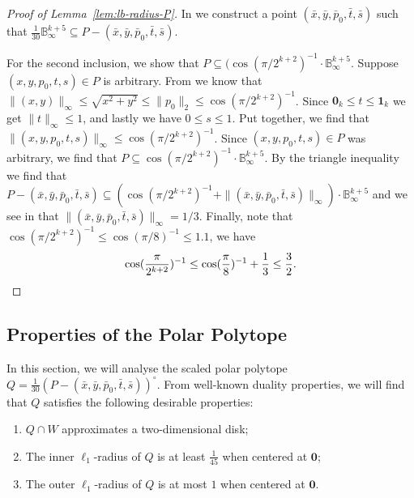 \documentclass{article}\usepackage[a4paper,margin=20mm]{geometry}
\renewcommand{\subset}{\subseteq}
\begin{document}
\begin{proof}[Proof of Lemma~\ref{lem:lb-radius-P}]
In  we construct a point $(\bar x, \bar y, \bar p_0, \bar t, \bar s)$
such that $\frac{1}{30}\mathbb{B}_\infty^{k+5} \subset P - (\bar x, \bar y, \bar{p}_0, \bar t, \bar{s})$.

For the second inclusion, we show that $P \subset (\cos(\pi/2^{k+2})^{-1}\cdot \mathbb{B}_\infty^{k+5}$.
Suppose $(x,y,p_0,t,s) \in P$ is arbitrary. From  we know
that $\|(x,y)\|_\infty \leq \sqrt{x^2 + y^2} \leq \|p_0\|_2 \leq \cos(\pi/2^{k+2})^{-1}$.
Since $\mathbf{0}_k \leq t \leq \mathbf{1}_k$ we get $\|t\|_\infty \leq 1$, and
lastly we have $0 \leq s \leq 1$.
Put together, we find that $\|(x,y,p_0,t,s)\|_\infty \leq \cos(\pi/2^{k+2})^{-1}$.
Since $(x,y,p_0,t,s) \in P$ was arbitrary, we find that $P \subset \cos(\pi/2^{k+2})^{-1}\cdot \mathbb{B}_\infty^{k+5}$.
By the triangle inequality we find that
$P - (\bar x, \bar y, \bar{p}_0, \bar t, \bar{s}) \subset (\cos(\pi/2^{k+2})^{-1} + \|(\bar x, \bar y, \bar p_0, \bar t, \bar s)\|_\infty)\cdot \mathbb{B}_\infty^{k+5}$
and we see in  that $\|(\bar x, \bar y, \bar p_0, \bar t, \bar s)\|_\infty = 1/3$.
Finally, note that $\cos(\pi/2^{k+2})^{-1} \leq \cos(\pi/8)^{-1} \leq 1.1$, we have 
\[
    \cos(\frac{\pi}{2^{k+2}})^{-1} \leq \cos(\frac{\pi}{8})^{-1} + \frac{1}{3} \leq \frac{3}{2}.\qedhere
\]
\end{proof}


\subsection{Properties of the Polar Polytope}\label{sec:lb-dual}

In this section, we will analyse the scaled polar polytope
$Q = \frac{1}{30}(P - (\bar x, \bar y,\bar p_0, \bar t, \bar s))^\circ$.
From well-known duality properties, we will find that $Q$ satisfies the following desirable properties:
\begin{enumerate}
    \item $Q \cap W$ approximates a two-dimensional disk;
    \item The inner $\ell_1$-radius of $Q$ is at least $\frac{1}{45}$ when centered at $\mathbf{0}$;
    \item The outer $\ell_1$-radius of $Q$ is at most $1$ when centered at $\mathbf{0}$.
\end{enumerate}
\end{document}
